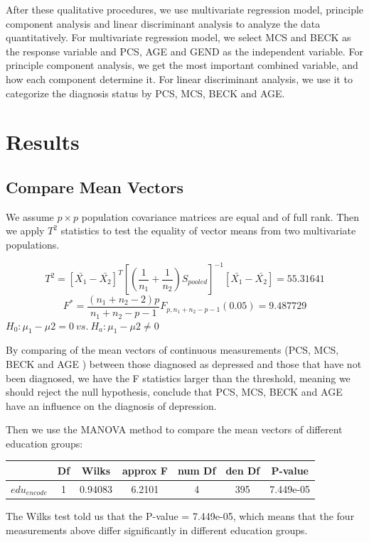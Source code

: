 \documentclass{article}
\begin{document}
    After these qualitative procedures, we use multivariate regression model, principle component analysis and linear discriminant analysis to analyze the data quantitatively. For multivariate regression model, we select MCS and BECK as the response variable and PCS, AGE and GEND as the independent variable. For principle component analysis, we get the most important combined variable, and how each component determine it. For linear discriminant analysis, we use it to categorize the diagnosis status by PCS, MCS, BECK and AGE.
  \section{Results}
    \subsection{Compare Mean Vectors}
      We assume $p\times p$ population covariance matrices are equal and of full rank. Then we apply $T^2$ statistics to test the equality of vector means from two multivariate populations.

      $$T^2 = [\bar{X_1} - \bar{X_2}]^T [(\frac{1}{n_1} + \frac{1}{n_2})S_{pooled}]^{-1} [\bar{X_1} - \bar{X_2}] = 55.31641$$
      $$F^* = \frac{(n_1 + n_2 - 2)p}{n_1 + n_2 - p - 1}F_{p, n_1 + n_2 - p - 1}(0.05) = 9.487729$$
      $H_0: \mu_1 - \mu2 = 0 ~ vs. ~ H_a: \mu_1 - \mu2 \neq 0$

      By comparing of the mean vectors of continuous measurements (PCS, MCS, BECK and AGE ) between those diagnosed as depressed and those that have not been diagnosed, we have the F statistics larger than the threshold, meaning  we should reject the null hypothesis, conclude that PCS, MCS, BECK and AGE have an influence on the diagnosis of depression.

      Then we use the MANOVA method to compare the mean vectors of different education groups:

      \begin{center}
      \begin{tabular}{c c c c c c c}
        \hline
         & Df & Wilks & approx F&num Df&den Df  &  P-value\\
        \hline
        $edu_{encode}$ & 1 & 0.94083 & 6.2101   &   4   & 395 & 7.449e-05\\
        \hline
      \end{tabular}
      \end{center}

      The Wilks test told us that the P-value = 7.449e-05, which means that the four measurements above differ significantly in different education groups.
\end{document}
